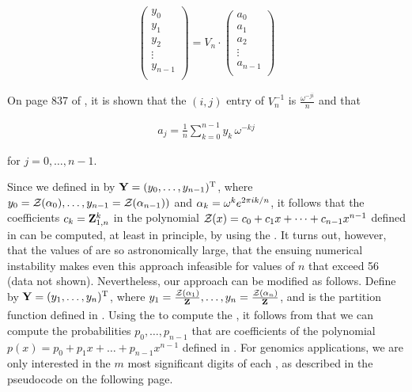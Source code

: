 \begin{align}
\label{eq:fftbor:dftMatrix}
\left(
\begin{array}{l}
y_0 \\
y_1 \\
y_2 \\
\vdots \\
y_{n-1} \\
\end{array}
\right)
= V_n \cdot
\left(
\begin{array}{l}
a_0 \\
a_1 \\
a_2 \\
\vdots \\
a_{n-1} \\
\end{array}
\right)
\end{align}

On page 837 of \citep{cormen}, it is shown that the
$(i,j)$ entry of $V_n^{-1}$ is $\frac{\omega^{-j i}}{n}$
and that

\begin{align}
\label{eq:fftbor:aFromY}
a_j = \frac{1}{n} \sum_{k=0}^{n-1} y_k\,\omega^{-kj}
\end{align}

for $j=0,\dots,n-1$.

Since we defined \bfY in  by ${\bf Y} =
(y_0,\dots,y_{n-1})^{\text T}$, where
$y_0={\mathcal Z}_{}(\alpha_0),\dots,y_{n-1}={\mathcal Z}_{}(\alpha_{n-1}))$
and $\alpha_k = \omega^k e^{2 \pi i k/n}$, it follows that the coefficients
$c_k={\bf Z}^{k}_{1,n}$ in the polynomial
${\mathcal Z}_{}(x) = c_0 + c_1 x + \dots + c_{n-1} x^{n-1}$ defined in
 can be computed, at least in principle,
by using the \fft. It turns out, however, that the values of
 are so astronomically large, that the ensuing numerical
instability makes even this approach infeasible for values of $n$
that exceed 56 (data not shown).
Nevertheless, our approach can be modified as follows.
Define \bfY by ${\bf Y} = (y_1,\dots,y_n)^{\text T}$, where
$y_1=\frac{{\mathcal Z}_{}(\alpha_1)}{{\bf Z}^{}_{}},\dots,
y_{n}=\frac{{\mathcal Z}_{}(\alpha_n)}{{\bf Z}^{}_{}}$, and
\fullZ is the partition function defined in .
Using the \fft to compute the \idft, it follows from
 that we can compute the probabilities $p_0,\dots,p_{n-1}$
that are coefficients of the polynomial
$p(x) = p_0 + p_1 x + \dots + p_{n-1}x^{n-1}$
defined in . For genomics applications, we are
only interested in the $m$ most significant digits of each \pk, as described
in the pseudocode on the following page.
\medskip

